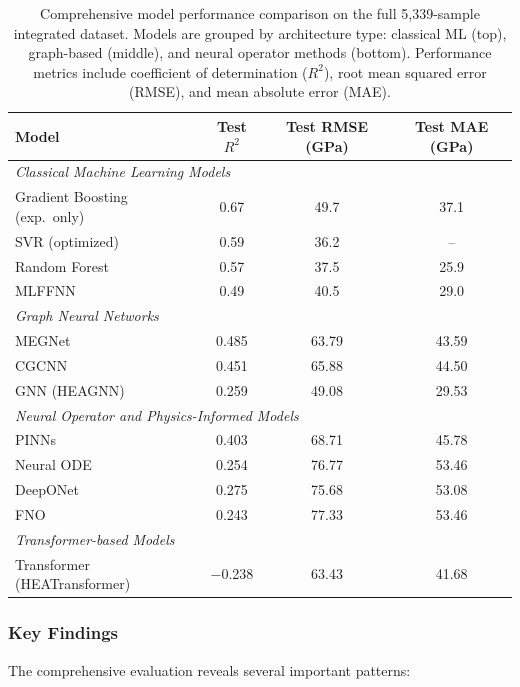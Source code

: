 \documentclass[11pt,a4paper]{article}
\begin{document}
\begin{table}[htbp]
\centering
\caption{Comprehensive model performance comparison on the full 5{,}339-sample integrated dataset. Models are grouped by architecture type: classical ML (top), graph-based (middle), and neural operator methods (bottom). Performance metrics include coefficient of determination ($R^2$), root mean squared error (RMSE), and mean absolute error (MAE).}
\label{tab:comprehensive_results}
\begin{tabular}{lccc}
\hline
\textbf{Model} & \textbf{Test $R^2$} & \textbf{Test RMSE (GPa)} & \textbf{Test MAE (GPa)} \\
\hline
\multicolumn{4}{l}{\textit{Classical Machine Learning Models}} \\
\hline
Gradient Boosting (exp.\ only) & 0.67 & 49.7 & 37.1 \\
SVR (optimized) & 0.59 & 36.2 & -- \\
Random Forest & 0.57 & 37.5 & 25.9 \\
MLFFNN & 0.49 & 40.5 & 29.0 \\
\hline
\multicolumn{4}{l}{\textit{Graph Neural Networks}} \\
\hline
MEGNet & 0.485 & 63.79 & 43.59 \\
CGCNN & 0.451 & 65.88 & 44.50 \\
GNN (HEAGNN) & 0.259 & 49.08 & 29.53 \\
\hline
\multicolumn{4}{l}{\textit{Neural Operator and Physics-Informed Models}} \\
\hline
PINNs & 0.403 & 68.71 & 45.78 \\
Neural ODE & 0.254 & 76.77 & 53.46 \\
DeepONet & 0.275 & 75.68 & 53.08 \\
FNO & 0.243 & 77.33 & 53.46 \\
\hline
\multicolumn{4}{l}{\textit{Transformer-based Models}} \\
\hline
Transformer (HEATransformer) & $-$0.238 & 63.43 & 41.68 \\
\hline
\end{tabular}
\end{table}

\subsubsection{Key Findings}

The comprehensive evaluation reveals several important patterns:
\end{document}
